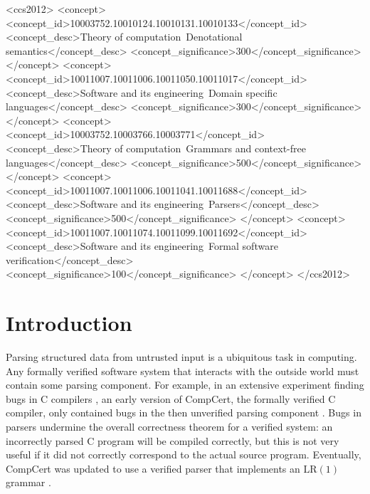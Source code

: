 \documentclass[acmsmall,nonacm]{acmart}
\newcommand{\LRR}{\textrm{LR}}
\newcommand{\LR}[1]{\LRR(#1)}
\begin{document}
\begin{CCSXML}
<ccs2012>
   <concept>
       <concept_id>10003752.10010124.10010131.10010133</concept_id>
       <concept_desc>Theory of computation~Denotational semantics</concept_desc>
       <concept_significance>300</concept_significance>
       </concept>
   <concept>
       <concept_id>10011007.10011006.10011050.10011017</concept_id>
       <concept_desc>Software and its engineering~Domain specific languages</concept_desc>
       <concept_significance>300</concept_significance>
       </concept>
   <concept>
       <concept_id>10003752.10003766.10003771</concept_id>
       <concept_desc>Theory of computation~Grammars and context-free languages</concept_desc>
       <concept_significance>500</concept_significance>
       </concept>
   <concept>
       <concept_id>10011007.10011006.10011041.10011688</concept_id>
       <concept_desc>Software and its engineering~Parsers</concept_desc>
       <concept_significance>500</concept_significance>
       </concept>
   <concept>
       <concept_id>10011007.10011074.10011099.10011692</concept_id>
       <concept_desc>Software and its engineering~Formal software verification</concept_desc>
       <concept_significance>100</concept_significance>
       </concept>
 </ccs2012>
\end{CCSXML}


\ifarxiv
\else
{}  %
\fi

\maketitle

\section{Introduction}
\label{sec:intro}
Parsing structured data from untrusted input is a ubiquitous task in
computing. Any formally verified software system that interacts with
the outside world must contain some parsing component. For example, in
an extensive experiment finding bugs in C compilers
\cite{yangFindingUnderstandingBugs}, an early version of CompCert, the formally
verified C compiler, only contained bugs in the then
unverified parsing component \cite{leroy_formal_2009}. Bugs in parsers
undermine the overall correctness theorem for a verified system: an
incorrectly parsed C program will be compiled correctly, but this is
not very useful if it did not correctly correspond to the actual
source program. Eventually, CompCert
was updated to use a verified parser that implements
an $\LR{1}$ grammar
\cite{jourdanValidatingLRParsers2012}.
\end{document}
